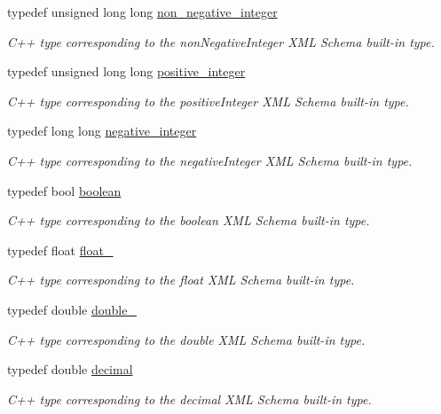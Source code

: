 \begin{DoxyCompactItemize}
typedef unsigned long long \hyperlink{namespacexml__schema_af42ef5911d65f41a0a03598b056f05aa}{non\-\_\-negative\-\_\-integer}
\begin{DoxyCompactList}\small\item\em C++ type corresponding to the non\-Negative\-Integer X\-M\-L Schema built-\/in type. \end{DoxyCompactList}\item 
typedef unsigned long long \hyperlink{namespacexml__schema_abe9d639a15a121d2868ae2f9c974ca24}{positive\-\_\-integer}
\begin{DoxyCompactList}\small\item\em C++ type corresponding to the positive\-Integer X\-M\-L Schema built-\/in type. \end{DoxyCompactList}\item 
typedef long long \hyperlink{namespacexml__schema_acf9528a84381d07f2802785c947bf441}{negative\-\_\-integer}
\begin{DoxyCompactList}\small\item\em C++ type corresponding to the negative\-Integer X\-M\-L Schema built-\/in type. \end{DoxyCompactList}\item 
typedef bool \hyperlink{namespacexml__schema_ae5ada4ec9c54b51765c3e4c0e9631bba}{boolean}
\begin{DoxyCompactList}\small\item\em C++ type corresponding to the boolean X\-M\-L Schema built-\/in type. \end{DoxyCompactList}\item 
typedef float \hyperlink{namespacexml__schema_ad7e04ab17bba0b3fdde43fb79ef6ed87}{float\-\_\-}
\begin{DoxyCompactList}\small\item\em C++ type corresponding to the float X\-M\-L Schema built-\/in type. \end{DoxyCompactList}\item 
typedef double \hyperlink{namespacexml__schema_aac2d3d3483d3a20e8d96d2e8e5b3a470}{double\-\_\-}
\begin{DoxyCompactList}\small\item\em C++ type corresponding to the double X\-M\-L Schema built-\/in type. \end{DoxyCompactList}\item 
typedef double \hyperlink{namespacexml__schema_a69bfaf24f63a8c18ebd8e21db6b343df}{decimal}
\begin{DoxyCompactList}\small\item\em C++ type corresponding to the decimal X\-M\-L Schema built-\/in type. \end{DoxyCompactList}\item 

\end{DoxyCompactItemize}
